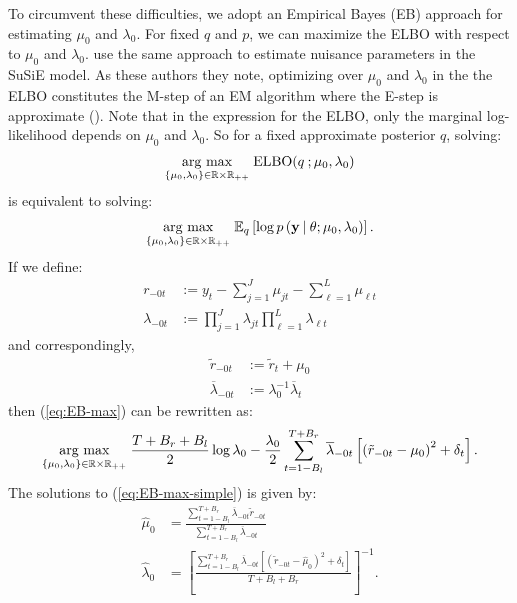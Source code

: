 To circumvent these difficulties, we adopt an Empirical Bayes (EB) approach for estimating $\mu_0$ and $\lambda_0$. For fixed $q$ and $p$, we can maximize the ELBO with respect to $\mu_0$ and $\lambda_0$. \cite{Wang20} use the same approach to estimate nuisance parameters in the SuSiE model. As these authors they note, optimizing over $\mu_0$ and $\lambda_0$ in the the ELBO constitutes the M-step of an EM algorithm where the E-step is approximate (\citealp{Dempster77, Heskes03, Neal98}). Note that in the expression for the ELBO, only the marginal log-likelihood depends on $\mu_0$ and $\lambda_0$. So for a fixed approximate posterior $q$, solving:
\begin{align}
    \underset{\{\mu_0,\lambda_0\}\in\mathbb{R}\times\mathbb{R}_{++}}{\text{arg max}} \; \text{ELBO}(q\:;\mu_0,\lambda_0)
\end{align}
is equivalent to solving:
\begin{align}\label{eq:EB-max}
    \underset{\{\mu_0,\lambda_0\}\in\mathbb{R}\times\mathbb{R}_{++}}{\text{arg max}} \; \mathbb{E}_{q} \left[\log p\left(\mathbf{y} \:|\: \theta;\mu_0,\lambda_0\right)\right].
\end{align}
If we define:
\begin{align}
    r_{-0t} &:= y_t - \sum_{j=1}^J \mu_{jt} - \sum_{\ell=1}^L \mu_{\ell t} \\
    \lambda_{-0t} &:= \prod_{j=1}^J \lambda_{jt} \prod_{\ell=1}^L \lambda_{\ell t}
\end{align}
and correspondingly,
\begin{align}
    \tilde{r}_{-0t} &:= \tilde{r}_t + \mu_0 \\
    \overline{\lambda}_{-0t} &:= \lambda_0^{-1}\overline{\lambda}_t
\end{align}
then (\ref{eq:EB-max}) can be rewritten as:
\small
\begin{align}\label{eq:EB-max-simple}
    \underset{\{\mu_0,\lambda_0\}\in\mathbb{R}\times\mathbb{R}_{++}}{\text{arg max}} \; \frac{T+B_r +B_l}{2}\log\lambda_0 - \frac{\lambda_0}{2}\sum_{t=1-B_l}^{T+B_r} \overline{\lambda}_{-0t}\left[\left(\tilde{r}_{-0t}-\mu_0\right)^2 + \delta_t\right].
\end{align}
\normalsize
The solutions to (\ref{eq:EB-max-simple}) is given by:
\begin{align}
    \hat{\mu}_0 &= \frac{\sum_{t=1-B_l}^{T+B_r} \overline{\lambda}_{-0t}\tilde{r}_{-0t}}{\sum_{t=1-B_l}^{T+B_r} \overline{\lambda}_{-0t}} \label{eq:EB-max-solution-mu} \\
    \hat{\lambda}_0 &= \left[\frac{\sum_{t=1-B_l}^{T+B_r} \overline{\lambda}_{-0t}[\left(\tilde{r}_{-0t}-\hat{\mu}_0\right)^2 + \delta_t]}{T+B_l+B_r}\right]^{-1}. \label{eq:EB-max-solution-lambda}
\end{align}
